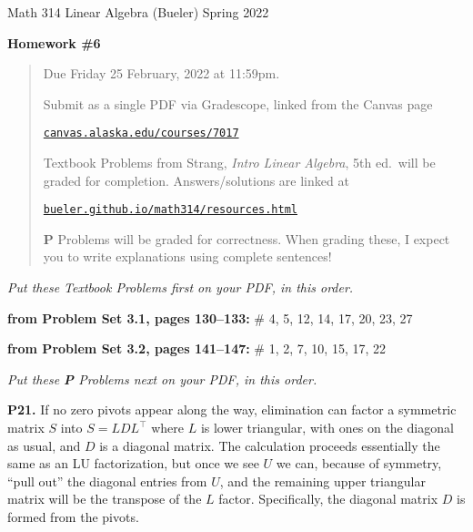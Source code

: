 \documentclass[12pt]{amsart}
\newcommand{\prob}[1]{\bigskip\noindent\textbf{#1.}\quad }
\newcommand{\probset}[2]{\bigskip\noindent\textbf{from Problem Set #1, pages #2:}\quad }
\begin{document}
\scriptsize \noindent Math 314 Linear Algebra (Bueler) \hfill Spring 2022
\normalsize\medskip

\Large
\centerline{\textbf{Homework \#6}}

\normalsize
\bigskip
\begin{quote}
Due Friday 25 February, 2022 at 11:59pm.

\medskip
\noindent Submit as a single PDF via Gradescope, linked from the Canvas page

\href{https://canvas.alaska.edu/courses/7017}{\texttt{canvas.alaska.edu/courses/7017}}

\noindent Textbook Problems from Strang, \emph{Intro Linear Algebra}, 5th ed.~will be graded for completion.  Answers/solutions are linked at

\href{https://bueler.github.io/math314/resources.html}{\texttt{bueler.github.io/math314/resources.html}}

\noindent \textbf{P} Problems will be graded for correctness.  When grading these, I expect you to write explanations using complete sentences!
\end{quote}
\medskip

\thispagestyle{empty}

\noindent \hrulefill

\noindent \emph{Put these Textbook Problems first on your PDF, in this order.}

\probset{3.1}{130--133} \# 4, 5, 12, 14, 17, 20, 23, 27

\probset{3.2}{141--147} \# 1, 2, 7, 10, 15, 17, 22


\bigskip
\noindent \hrulefill

\noindent \emph{Put these \textbf{P} Problems next on your PDF, in this order.}

\prob{P21}  If no zero pivots appear along the way, elimination can factor a symmetric matrix $S$ into $S=L D L^\top$ where $L$ is lower triangular, with ones on the diagonal as usual, and $D$ is a diagonal matrix.  The calculation proceeds essentially the same as an LU factorization, but once we see $U$ we can, because of symmetry, ``pull out'' the diagonal entries from $U$, and the remaining upper triangular matrix will be the transpose of the $L$ factor.  Specifically, the diagonal matrix $D$ is formed from the pivots.
\end{document}

